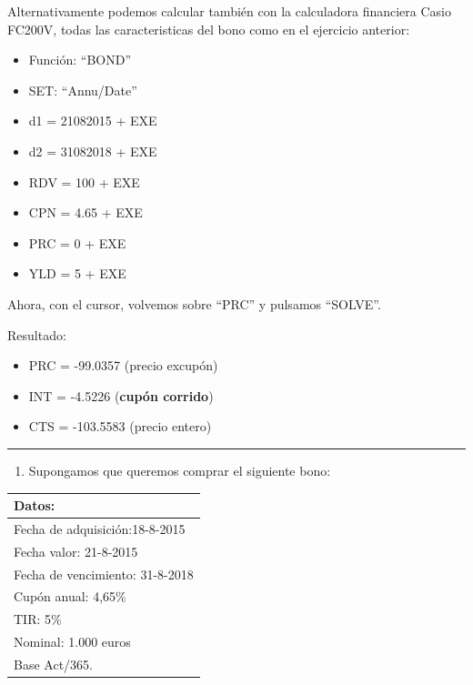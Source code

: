 \documentclass[
  letterpaper,
  DIV=11,
  numbers=noendperiod]{scrreprt}
\providecommand{\tightlist}{%
  \setlength{\itemsep}{0pt}\setlength{\parskip}{0pt}}\usepackage{longtable,booktabs,array}
\begin{document}
\begin{tcolorbox}[enhanced jigsaw, left=2mm, opacityback=0, colback=white, breakable, arc=.35mm, bottomrule=.15mm, rightrule=.15mm, toprule=.15mm, leftrule=.75mm, colframe=quarto-callout-tip-color-frame]
\begin{minipage}[t]{\textwidth - 5.5mm}
Alternativamente podemos calcular también con la calculadora financiera
Casio FC200V, todas las caracteristicas del bono como en el ejercicio
anterior:

\begin{itemize}
\item
  Función: ``BOND''
\item
  SET: ``Annu/Date''
\item
  d1 = 21082015 + EXE
\item
  d2 = 31082018 + EXE
\item
  RDV = 100 + EXE
\item
  CPN = 4.65 + EXE
\item
  PRC = 0 + EXE
\item
  YLD = 5 + EXE
\end{itemize}

Ahora, con el cursor, volvemos sobre ``PRC'' y pulsamos ``SOLVE''.

Resultado:

\begin{itemize}
\item
  PRC = -99.0357 (precio excupón)
\item
  INT = -4.5226 (\textbf{cupón corrido})
\item
  CTS = -103.5583 (precio entero)
\end{itemize}

\end{minipage}%
\end{tcolorbox}

\begin{center}\rule{0.5\linewidth}{0.5pt}\end{center}

\begin{enumerate}
\def\labelenumi{\arabic{enumi}.}
\setcounter{enumi}{31}
\tightlist
\item
  Supongamos que queremos comprar el siguiente bono:
\end{enumerate}

\begin{longtable}[]{@{}l@{}}
\toprule()
\textbf{Datos:} \\
\midrule()
\endhead
Fecha de adquisición:18-8-2015 \\
Fecha valor: 21-8-2015 \\
Fecha de vencimiento: 31-8-2018 \\
Cupón anual: 4,65\% \\
TIR: 5\% \\
Nominal: 1.000 euros \\
Base Act/365. \\
\bottomrule()
\end{longtable}
\end{document}
